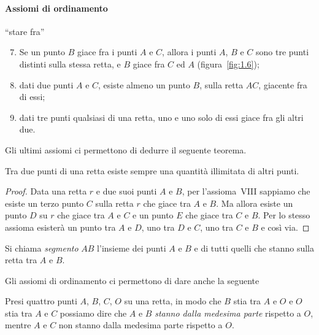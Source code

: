 \paragraph{Assiomi di ordinamento} ``stare fra''
\begin{enumerate}[label=\Roman{*}.]
\setcounter{enumi}{6}
\item Se un punto $B$ giace fra i punti $A$ e $C$, allora i punti $A$, $B$ e $C$ sono tre punti distinti sulla stessa retta, e $B$ giace fra $C$ ed $A$ (figura~\ref{fig:1.6});
\item dati due punti $A$ e $C$, esiste almeno un punto $B$, sulla retta $AC$, giacente fra di essi;
\item dati tre punti qualsiasi di una retta, uno e uno solo di essi giace fra gli altri due.
\end{enumerate}
Gli ultimi assiomi ci permettono di dedurre il seguente teorema.
\begin{teorema}
Tra due punti di una retta esiste sempre una quantità illimitata di altri punti.
\end{teorema}
\begin{proof}
Data una retta $r$ e due suoi punti $A$ e $B$, per l'assioma~VIII sappiamo che esiste un terzo punto $C$ sulla retta $r$ che giace tra $A$ e $B$. Ma allora esiste un punto $D$ su $r$ che giace tra $A$ e $C$ e un punto $E$ che giace tra $C$ e $B$. Per lo stesso assioma esisterà un punto tra $A$ e $D$, uno tra $D$ e $C$, uno tra $C$ e $B$ e così via.
\end{proof}
\begin{center}

\end{center}
\begin{definizione}
Si chiama \emph{segmento} $AB$ l'insieme dei punti $A$ e $B$ e di tutti quelli che stanno sulla retta tra $A$ e $B$.
\end{definizione}
Gli assiomi di ordinamento ci permettono di dare anche la seguente

\begin{definizione}
Presi quattro punti $A$, $B$, $C$, $O$ su una retta, in modo che $B$ stia tra $A$ e $O$ e $O$ stia tra $A$ e $C$ possiamo dire che $A$ e $B$ \emph{stanno dalla medesima parte} rispetto a $O$, mentre $A$ e $C$ non stanno dalla medesima parte rispetto a $O$.
\end{definizione}
\begin{center}

\end{center}

